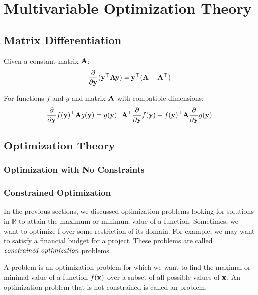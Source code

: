 \chapter{Multivariable Optimization Theory}

\section{Matrix Differentiation}

\begin{theorem}
    Given a constant matrix $\MA$:
    $$\frac{\partial}{\partial\vy}(\vy^\top\MA\vy) = \vy^\top(\MA + \MA^\top)$$
\end{theorem}
\begin{theorem}
    For functions $f$ and $g$ and matrix $\MA$ with compatible dimensions:
    $$\frac{\partial}{\partial\vy}f(\vy)^\top\MA g(\vy) = g(\vy)^\top\MA^\top\frac{\partial}{\partial\vy}f(\vy) + f(\vy)^\top\MA\frac{\partial}{\partial\vy}g(\vy)$$
\end{theorem}

\section{Optimization Theory} \label{optim}

\subsection{Optimization with No Constraints} 

\subsection{Constrained Optimization}

In the previous sections, we discussed optimization problems looking for solutions in $\mathbb{R}$ to attain the maximum or minimum value of a function. Sometimes, we want to optimize f over some restriction of its domain. For example, we may want to satisfy a financial budget for a project. These problems are called $\define{constrained optimization}$ problems.

\begin{definition}\label{def_constrained_optimization} 
A  problem is an optimization problem for which we want to find the maximal or minimal value of a function $f(\vx)$ over a subset of all possible values of $\vx$. An optimization problem that is not constrained is called an  problem.
\end{definition}

